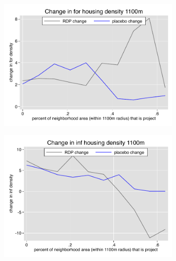 \documentclass[12pt]{article}
\begin{document}
\begin{figure}
        \begin{subfigure}[b]{0.495\textwidth}
            \centering
            \includegraphics[width=\textwidth,trim={0.3cm .3cm 0.1cm 0cm}, clip=true]{figures/change_for_1100_local.pdf}
        \end{subfigure}
        \hfill
        \begin{subfigure}[b]{0.495\textwidth}  
            \centering 
            \includegraphics[width=\textwidth,trim={0.3cm .3cm 0.1cm 0cm}, clip=true]{figures/change_inf_1100_local.pdf}
        \end{subfigure}
        \vspace{-6mm}
  \end{figure} 
\end{document}
